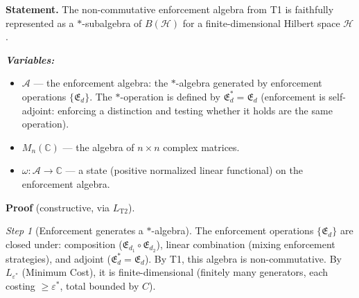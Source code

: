 \documentclass[11pt]{article}
\newenvironment{varlist}{\begin{itemize}[nosep,leftmargin=2em]}{\end{itemize}}
\begin{document}
\begin{tcolorbox}[apfbox, title={T2: Noncommutativity $\to$ Operator Algebra on Hilbert Space}]
\textbf{Statement.}  The non-commutative enforcement algebra from T1 is faithfully represented as a $*$-subalgebra of $B(\mathcal{H})$ for a finite-dimensional Hilbert space $\mathcal{H}$.

\smallskip\noindent\textbf{\textit{Variables:}}
\begin{varlist}
\item $\mathcal{A}$ --- the enforcement algebra: the $*$-algebra generated by enforcement operations $\{\mathfrak{E}_d\}$.  The $*$-operation is defined by $\mathfrak{E}_d^* = \mathfrak{E}_d$ (enforcement is self-adjoint: enforcing a distinction and testing whether it holds are the same operation).
\item $M_n(\mathbb{C})$ --- the algebra of $n \times n$ complex matrices.
\item $\omega: \mathcal{A} \to \mathbb{C}$ --- a state (positive normalized linear functional) on the enforcement algebra.
\end{varlist}

\smallskip\noindent\textbf{Proof} (constructive, via $L_{\mathrm{T2}}$).

\textit{Step 1} (Enforcement generates a $*$-algebra).  The enforcement operations $\{\mathfrak{E}_d\}$ are closed under: composition ($\mathfrak{E}_{d_1} \circ \mathfrak{E}_{d_2}$), linear combination (mixing enforcement strategies), and adjoint ($\mathfrak{E}_d^* = \mathfrak{E}_d$).  By T1, this algebra is non-commutative.  By $L_{\varepsilon^*}$ (Minimum Cost), it is finite-dimensional (finitely many generators, each costing $\ge \varepsilon^*$, total bounded by $C$).


\end{tcolorbox}
\end{document}
